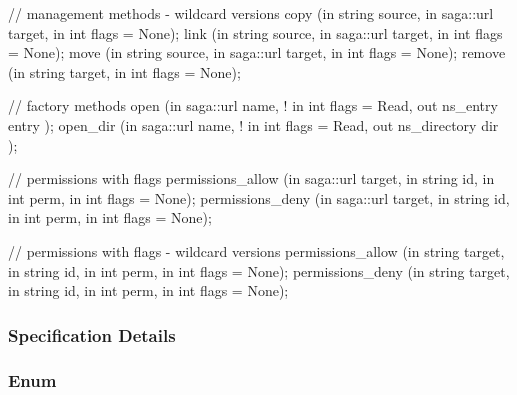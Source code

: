 \begin{myspec}
{{      // management methods - wildcard versions
      copy               (in  string         source,
                          in  saga::url      target,
                          in  int            flags = None);
      link               (in  string         source,
                          in  saga::url      target,
                          in  int            flags = None);
      move               (in  string         source,
                          in  saga::url      target,
                          in  int            flags = None);
      remove             (in  string         target,
                          in  int            flags = None);
 
      // factory methods
      open               (in  saga::url      name,
!                         in  int            flags = Read,
                          out ns_entry       entry   );
      open_dir            (in  saga::url     name,
!                         in  int            flags = Read,
                          out ns_directory   dir     );
 
 
      // permissions with flags
      permissions_allow  (in  saga::url      target,
                          in  string         id,
                          in  int            perm, 
                          in  int            flags = None);
      permissions_deny   (in  saga::url      target,
                          in  string         id,
                          in  int            perm, 
                          in  int            flags = None);
 
      // permissions with flags - wildcard versions
      permissions_allow  (in  string         target,
                          in  string         id,
                          in  int            perm, 
                          in  int            flags = None);
      permissions_deny   (in  string         target,
                          in  string         id,
                          in  int            perm, 
                          in  int            flags = None);
    }
  }
 \end{myspec}
 
 
 \subsubsection{Specification Details}
 
  \subsubsection*{Enum }
 
